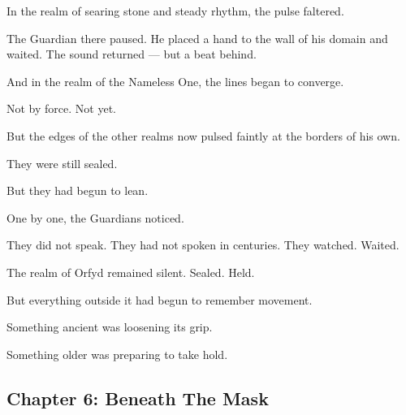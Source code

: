 \documentclass[9pt]{article}
\begin{document}
In the realm of searing stone and steady rhythm, the pulse faltered.

The Guardian there paused. He placed a hand to the wall of his domain and waited. The sound returned — but a beat behind.

And in the realm of the Nameless One, the lines began to converge.

Not by force. Not yet.

But the edges of the other realms now pulsed faintly at the borders of his own.

They were still sealed.

But they had begun to lean.

One by one, the Guardians noticed.

They did not speak. They had not spoken in centuries. They watched. Waited.

The realm of Orfyd remained silent. Sealed. Held.

But everything outside it had begun to remember movement.

Something ancient was loosening its grip.

Something older was preparing to take hold.



\newpage

\subsection*{Chapter 6: Beneath The Mask}

\vspace{1in}
\end{document}
